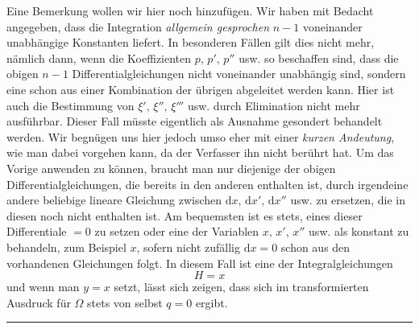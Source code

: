 Eine Bemerkung wollen wir hier noch hinzufügen. Wir haben mit Bedacht angegeben, dass die Integration \emph{allgemein gesprochen} \(n-1\) voneinander unabhängige Konstanten liefert. In besonderen Fällen gilt dies nicht mehr, nämlich dann, wenn die Koeffizienten \(p,\,p',\,p''\) usw. so beschaffen sind, dass die obigen \(n-1\) Differentialgleichungen nicht voneinander unabhängig sind, sondern eine schon aus einer Kombination der übrigen abgeleitet werden kann. Hier ist auch die Bestimmung von \(\xi',\,\xi'',\,\xi'''\) usw. durch Elimination nicht mehr ausführbar. Dieser Fall müsste eigentlich als Ausnahme gesondert behandelt werden. Wir begnügen uns hier jedoch umso eher mit einer \emph{kurzen Andeutung}, wie man dabei vorgehen kann, da der Verfasser ihn nicht berührt hat. Um das Vorige anwenden zu können, braucht man nur diejenige der obigen Differentialgleichungen, die bereits in den anderen enthalten ist, durch irgendeine andere beliebige lineare Gleichung zwischen \(\mathrm{d}x,\,\mathrm{d}x',\,\mathrm{d}x''\) usw. zu ersetzen, die in diesen noch nicht enthalten ist. Am bequemsten ist es stets, eines dieser Differentiale \(=0\) zu setzen oder eine der Variablen \(x,\,x',\,x''\) usw.
 als konstant zu behandeln, zum Beispiel \(x\), sofern nicht zufällig \(\mathrm{d}x=0\) schon aus den vorhandenen Gleichungen folgt. In diesem Fall ist eine der Integralgleichungen
\[
H=x
\]
und wenn man \(y=x\) setzt, lässt sich zeigen, dass sich im transformierten Ausdruck für \(\Omega\) stets von selbst \(q=0\) ergibt.

\begin{center}\rule{0.25\linewidth}{0.3pt}\end{center}


